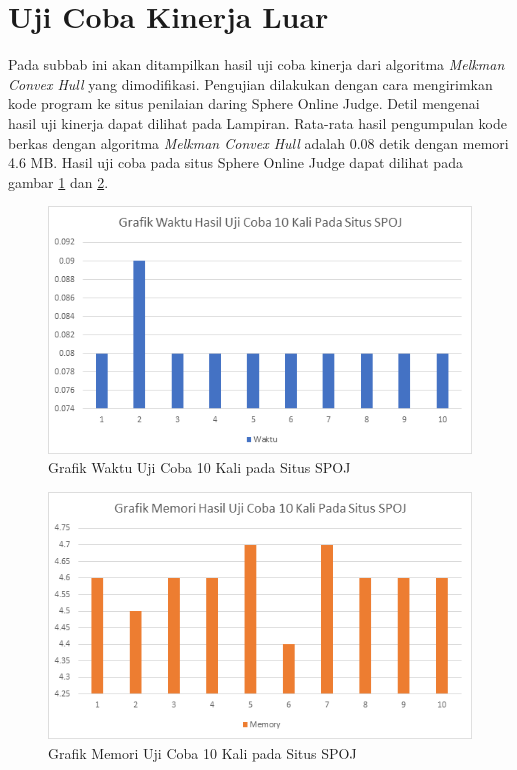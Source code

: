 \section{Uji Coba Kinerja Luar}
Pada subbab ini akan ditampilkan hasil uji coba kinerja dari algoritma \textit{Melkman Convex Hull} yang dimodifikasi. Pengujian dilakukan dengan cara mengirimkan kode program ke situs penilaian daring Sphere Online Judge. Detil mengenai hasil uji kinerja dapat dilihat pada Lampiran. Rata-rata hasil pengumpulan kode berkas dengan algoritma \textit{Melkman Convex Hull} adalah 0.08 detik dengan memori 4.6 MB. Hasil uji coba pada situs Sphere Online Judge dapat dilihat pada gambar \ref{fig:grafik-waktu-uji-coba-spoj} dan \ref{fig:grafik-memori-uji-coba-spoj}.
\begin{figure}[!h]
	\Centering
	\includegraphics [width=\columnwidth]{bab5/img/grafik-waktu-uji-coba-spoj}
	\caption {Grafik Waktu Uji Coba 10 Kali pada Situs SPOJ}
	\label {fig:grafik-waktu-uji-coba-spoj}
\end{figure}
\begin{figure}[!h]
	\Centering
	\includegraphics [width=\columnwidth]{bab5/img/grafik-memori-uji-coba-spoj}
	\caption {Grafik Memori Uji Coba 10 Kali pada Situs SPOJ}
	\label {fig:grafik-memori-uji-coba-spoj}
\end{figure}

